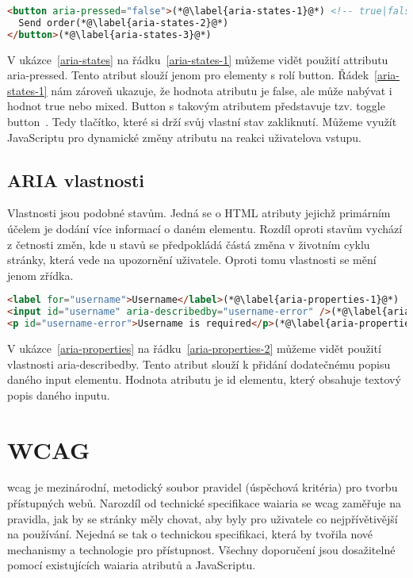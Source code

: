 \begin{lstlisting}[caption={Aria stavové atributy}, label={aria-states}, language=html]
<button aria-pressed="false">(*@\label{aria-states-1}@*) <!-- true|false|mixed -->
  Send order(*@\label{aria-states-2}@*)
</button>(*@\label{aria-states-3}@*)
\end{lstlisting}

V ukázce~\ref{aria-states} na řádku~\ref{aria-states-1} můžeme vidět použití attributu aria-pressed.
Tento atribut slouží jenom pro elementy s rolí button.
Řádek~\ref{aria-states-1} nám zároveň ukazuje, že hodnota atributu je false, ale může nabývat i hodnot true nebo mixed.
Button s takovým atributem představuje tzv. toggle button~\cite{mdn-aria-pressed}. Tedy tlačítko, které si drží svůj vlastní stav zakliknutí.
Můžeme využít JavaScriptu pro dynamické změny atributu na reakci uživatelova vstupu.

\subsection{ARIA vlastnosti}

Vlastnosti jsou podobné stavům.
Jedná se o HTML atributy jejichž primárním účelem je dodání více informací o daném elementu.
Rozdíl oproti stavům vychází z četnosti změn, kde u stavů se předpokládá částá změna v životním cyklu stránky, která vede na upozornění uživatele.
Oproti tomu vlastnosti se mění jenom zřídka.

\begin{lstlisting}[caption={Aria vlastnosti}, label={aria-properties}, language=html]
<label for="username">Username</label>(*@\label{aria-properties-1}@*)
<input id="username" aria-describedby="username-error" />(*@\label{aria-properties-2}@*)
<p id="username-error">Username is required</p>(*@\label{aria-properties-3}@*)
\end{lstlisting}

V ukázce~\ref{aria-properties} na řádku~\ref{aria-properties-2} můžeme vidět použití vlastnosti aria-describedby.
Tento atribut slouží k přidání dodatečnému popisu daného input elementu. Hodnota atributu je id elementu, který obsahuje textový popis daného inputu.

\section{WCAG}

\gls{wcag} je mezinárodní, metodický soubor pravidel (úspěchová kritéria) pro tvorbu přístupných webů.
Narozdíl od technické specifikace \gls{waiaria} se \gls{wcag} zaměřuje na pravidla, jak by se stránky měly chovat, aby byly pro uživatele co nejpřívětivější na používání.
Nejedná se tak o technickou specifikaci, která by tvořila nové mechanismy a technologie pro přístupnost.
Všechny doporučení jsou dosažitelné pomocí existujících \gls{waiaria} atributů a JavaScriptu.

